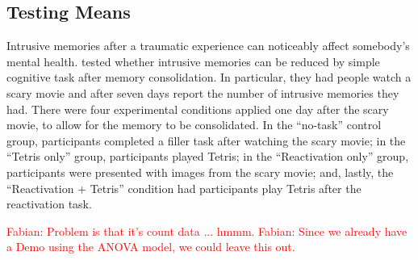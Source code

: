 \documentclass[11pt,a4paper]{article}
\theoremstyle{definition} %
\theoremstyle{case}
\newcommand{\FD}[1]{\textcolor{red}{Fabian: #1 }}
\begin{document}
\subsection{Testing Means}
Intrusive memories after a traumatic experience can noticeably affect somebody's mental health. \textcite{james2015computer} tested whether intrusive memories can be reduced by simple cognitive task after memory consolidation. In particular, they had people watch a scary movie and after seven days report the number of intrusive memories they had. There were four experimental conditions applied one day after the scary movie, to allow for the memory to be consolidated. In the ``no-task'' control group, participants completed a filler task after watching the scary movie; in the ``Tetris only'' group, participants played Tetris; in the ``Reactivation only'' group, participants were presented with images from the scary movie; and, lastly, the ``Reactivation + Tetris'' condition had participants play Tetris after the reactivation task.



\FD{Problem is that it's count data ... hmmm.}
\FD{Since we already have a Demo using the ANOVA model, we could leave this out.}
\fi

\end{document}
